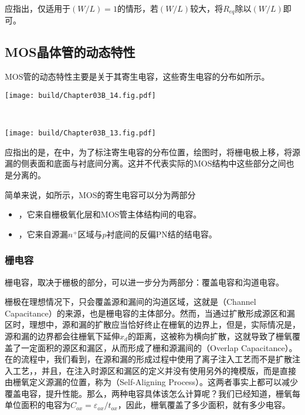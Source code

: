 应指出，仅适用于$(W/L)=1$的情形，若$(W/L)$较大，将$R_{eq}$除以$(W/L)$即可。

\subsection{MOS晶体管的动态特性}

MOS管的动态特性主要是关于其寄生电容，这些寄生电容的分布如所示。

\begin{Figure}[MOS管的电容分布]
    \begin{FigureSub}
        \texttt{[image: build/Chapter03B\_14.fig.pdf]}
    \end{FigureSub}\\ \vspace{0.25cm}
    \begin{FigureSub}
        \texttt{[image: build/Chapter03B\_13.fig.pdf]}
    \end{FigureSub}
\end{Figure}

应指出的是，在中，为了标注寄生电容的分布位置，绘图时，将栅电极上移，将源漏的侧表面和底面与衬底间分离。这并不代表实际的MOS结构中这些部分之间也是分离的。

简单来说，如所示，MOS的寄生电容可以分为两部分
\begin{itemize}
    \item {}，它来自栅极氧化层和MOS管主体结构间的电容。
    \item {}，它来自源漏$n^{+}$区域与$p$衬底间的反偏PN结的结电容。
\end{itemize}

\subsubsection{栅电容}
栅电容，取决于栅极的部分，可以进一步分为两部分：覆盖电容和沟道电容。

栅极在理想情况下，只会覆盖源和漏间的沟道区域，这就是（Channel Capacitance）的来源，也是栅电容的主体部分。然而，当通过扩散形成源区和漏区时，理想中，源和漏的扩散应当恰好终止在栅氧的边界上，但是，实际情况是，源和漏的边界都会往栅氧下延伸$x_d$的距离，这被称为横向扩散，这就导致了栅氧覆盖了一定面积的源区和漏区，从而形成了栅和源漏间的（Overlap Capacitance）。在的流程中，我们看到，在源和漏的形成过程中使用了离子注入工艺而不是扩散注入工艺，，并且，在注入时源区和漏区的定义并没有使用另外的掩模版，而是直接由栅氧定义源漏的位置，称为（Self-Aligning Process）。这两者事实上都可以减少覆盖电容，提升性能。那么，两种电容具体该怎么计算呢？我们已经知道，栅氧每单位面积的电容为$C_{ox}=\varepsilon_{ox}/t_{ox}$，因此，栅氧覆盖了多少面积，就有多少电容。

